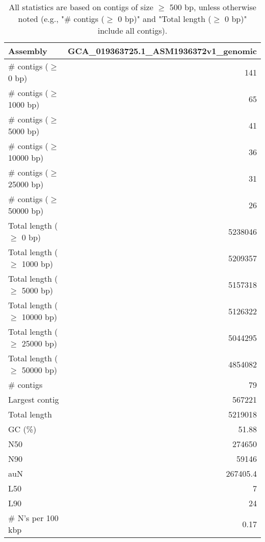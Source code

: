 \documentclass[12pt,a4paper]{article}
\begin{document}
\begin{table}[ht]
\begin{center}
\caption{All statistics are based on contigs of size $\geq$ 500 bp, unless otherwise noted (e.g., "\# contigs ($\geq$ 0 bp)" and "Total length ($\geq$ 0 bp)" include all contigs).}
\begin{tabular}{|l*{1}{|r}|}
\hline
Assembly & GCA\_019363725.1\_ASM1936372v1\_genomic \\ \hline
\# contigs ($\geq$ 0 bp) & 141 \\ \hline
\# contigs ($\geq$ 1000 bp) & 65 \\ \hline
\# contigs ($\geq$ 5000 bp) & 41 \\ \hline
\# contigs ($\geq$ 10000 bp) & 36 \\ \hline
\# contigs ($\geq$ 25000 bp) & 31 \\ \hline
\# contigs ($\geq$ 50000 bp) & 26 \\ \hline
Total length ($\geq$ 0 bp) & 5238046 \\ \hline
Total length ($\geq$ 1000 bp) & 5209357 \\ \hline
Total length ($\geq$ 5000 bp) & 5157318 \\ \hline
Total length ($\geq$ 10000 bp) & 5126322 \\ \hline
Total length ($\geq$ 25000 bp) & 5044295 \\ \hline
Total length ($\geq$ 50000 bp) & 4854082 \\ \hline
\# contigs & 79 \\ \hline
Largest contig & 567221 \\ \hline
Total length & 5219018 \\ \hline
GC (\%) & 51.88 \\ \hline
N50 & 274650 \\ \hline
N90 & 59146 \\ \hline
auN & 267405.4 \\ \hline
L50 & 7 \\ \hline
L90 & 24 \\ \hline
\# N's per 100 kbp & 0.17 \\ \hline
\end{tabular}
\end{center}
\end{table}
\end{document}
